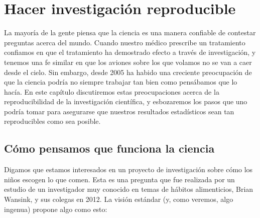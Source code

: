 \documentclass[
  12pt,
]{book}
\begin{document}
\hypertarget{doing-reproducible-research}{%
\chapter{Hacer investigación reproducible}\label{doing-reproducible-research}}

La mayoría de la gente piensa que la ciencia es una manera confiable de contestar preguntas acerca del mundo. Cuando nuestro médico prescribe un tratamiento confiamos en que el tratamiento ha demostrado efecto a través de investigación, y tenemos una fe similar en que los aviones sobre los que volamos no se van a caer desde el cielo. Sin embargo, desde 2005 ha habido una creciente preocupación de que la ciencia podría no siempre trabajar tan bien como pensábamos que lo hacía. En este capítulo discutiremos estas preocupaciones acerca de la reproducibilidad de la investigación científica, y esbozaremos los pasos que uno podría tomar para asegurarse que nuestros resultados estadísticos sean tan reproducibles como sea posible.

\hypertarget{cuxf3mo-pensamos-que-funciona-la-ciencia}{%
\section{Cómo pensamos que funciona la ciencia}\label{cuxf3mo-pensamos-que-funciona-la-ciencia}}

Digamos que estamos interesados en un proyecto de investigación sobre cómo los niños escogen lo que comen. Esta es una pregunta que fue realizada por un estudio de un investigador muy conocido en temas de hábitos alimenticios, Brian Wansink, y sus colegas en 2012. La visión estándar (y, como veremos, algo ingenua) propone algo como esto:
\end{document}
